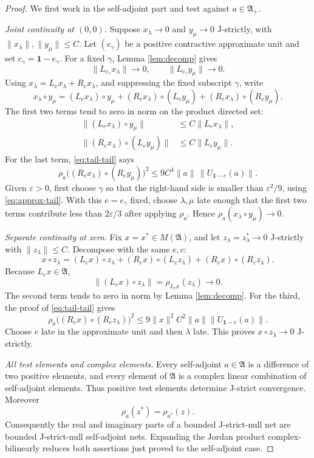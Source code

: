 \documentclass[11pt]{article}
\newcommand{\A}{\mathfrak A}
\newcommand{\M}{M(\mathfrak A)}
\newcommand{\one}{\mathbf 1}
\begin{document}
\begin{proof}
We first work in the self-adjoint part and test against \(a\in\A_+\).

\smallskip
\noindent\emph{Joint continuity at \((0,0)\).}
Suppose \(x_\lambda\to0\) and \(y_\mu\to0\) J-strictly, with
\(\lVert x_\lambda\rVert,\lVert y_\mu\rVert\leq C\). Let
\((e_\gamma)\) be a positive contractive approximate unit and set
\(c_\gamma=\one-e_\gamma\). For a fixed \(\gamma\), Lemma
\ref{lem:decomp} gives
\[
 \lVert L_{e_\gamma}x_\lambda\rVert\longrightarrow0,\qquad
 \lVert L_{e_\gamma}y_\mu\rVert\longrightarrow0.
\]
Using \(x_\lambda=L_ex_\lambda+R_ex_\lambda\), and suppressing the fixed
subscript \(\gamma\), write
\[
 x_\lambda\circ y_\mu
 =(L_ex_\lambda)\circ y_\mu
 +(R_ex_\lambda)\circ(L_ey_\mu)
 +(R_ex_\lambda)\circ(R_ey_\mu).
\]
The first two terms tend to zero in norm on the product directed set:
\[
\begin{aligned}
 \lVert(L_ex_\lambda)\circ y_\mu\rVert
 &\leq C\lVert L_ex_\lambda\rVert,\\
 \lVert(R_ex_\lambda)\circ(L_ey_\mu)\rVert
 &\leq C\lVert L_ey_\mu\rVert.
\end{aligned}
\]
For the last term, \eqref{eq:tail-tail} says
\[
 \rho_a\bigl((R_ex_\lambda)\circ(R_ey_\mu)\bigr)^2
 \leq9C^4\lVert a\rVert\,\lVert U_{\one-e}(a)\rVert.
\]
Given \(\varepsilon>0\), first choose \(\gamma\) so that the right-hand side
is smaller than \(\varepsilon^2/9\), using
\eqref{eq:approx-tail}. With this \(e=e_\gamma\) fixed, choose
\(\lambda,\mu\) late enough that the first two terms contribute less than
\(2\varepsilon/3\) after applying \(\rho_a\). Hence
\(\rho_a(x_\lambda\circ y_\mu)\to0\).

\smallskip
\noindent\emph{Separate continuity at zero.}
Fix \(x=x^*\in\M\), and let \(z_\lambda=z_\lambda^*\to0\) J-strictly with
\(\lVert z_\lambda\rVert\leq C\). Decompose with the same \(e,c\):
\[
 x\circ z_\lambda
 =(L_ex)\circ z_\lambda
 +(R_ex)\circ(L_ez_\lambda)
 +(R_ex)\circ(R_ez_\lambda).
\]
Because \(L_ex\in\A\),
\[
 \lVert(L_ex)\circ z_\lambda\rVert=\rho_{L_ex}(z_\lambda)\longrightarrow0.
\]
The second term tends to zero in norm by Lemma \ref{lem:decomp}. For the
third, the proof of \eqref{eq:tail-tail} gives
\[
 \rho_a\bigl((R_ex)\circ(R_ez_\lambda)\bigr)^2
 \leq9\lVert x\rVert^2C^2\lVert a\rVert
       \lVert U_{\one-e}(a)\rVert.
\]
Choose \(e\) late in the approximate unit and then \(\lambda\) late. This
proves \(x\circ z_\lambda\to0\) J-strictly.

\smallskip
\noindent\emph{All test elements and complex elements.}
Every self-adjoint \(a\in\A\) is a difference of two positive elements, and
every element of \(\A\) is a complex linear combination of self-adjoint
elements. Thus positive test elements determine J-strict convergence.
Moreover
\[
 \rho_a(z^*)=\rho_{a^*}(z).
\]
Consequently the real and imaginary parts of a bounded J-strict-null net are
bounded J-strict-null self-adjoint nets. Expanding the Jordan product
complex-bilinearly reduces both assertions just proved to the self-adjoint
case.


\end{proof}
\end{document}
